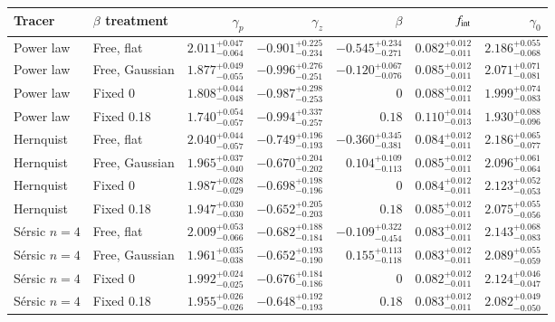 \begin{tabular}{llrrrrr}
\toprule
Tracer & $\beta$ treatment & $\gamma_p$ & $\gamma_z$ & $\beta$ & $f_{\rm int}$ & $\gamma_0$ \\
\midrule
Power law & Free, flat & $2.011_{-0.064}^{+0.047}$ & $-0.901_{-0.234}^{+0.225}$ & $-0.545_{-0.271}^{+0.234}$ & $0.082_{-0.011}^{+0.012}$ & $2.186_{-0.068}^{+0.055}$ \\
Power law & Free, Gaussian & $1.877_{-0.055}^{+0.049}$ & $-0.996_{-0.251}^{+0.276}$ & $-0.120_{-0.076}^{+0.067}$ & $0.085_{-0.011}^{+0.012}$ & $2.071_{-0.081}^{+0.071}$ \\
Power law & Fixed 0 & $1.808_{-0.048}^{+0.044}$ & $-0.987_{-0.253}^{+0.298}$ & $0$ & $0.088_{-0.011}^{+0.012}$ & $1.999_{-0.083}^{+0.074}$ \\
Power law & Fixed 0.18 & $1.740_{-0.057}^{+0.054}$ & $-0.994_{-0.257}^{+0.337}$ & $0.18$ & $0.110_{-0.013}^{+0.014}$ & $1.930_{-0.096}^{+0.088}$ \\
Hernquist & Free, flat & $2.040_{-0.057}^{+0.044}$ & $-0.749_{-0.193}^{+0.196}$ & $-0.360_{-0.381}^{+0.345}$ & $0.084_{-0.011}^{+0.012}$ & $2.186_{-0.077}^{+0.065}$ \\
Hernquist & Free, Gaussian & $1.965_{-0.040}^{+0.037}$ & $-0.670_{-0.202}^{+0.204}$ & $0.104_{-0.113}^{+0.109}$ & $0.085_{-0.011}^{+0.012}$ & $2.096_{-0.064}^{+0.061}$ \\
Hernquist & Fixed 0 & $1.987_{-0.029}^{+0.028}$ & $-0.698_{-0.196}^{+0.198}$ & $0$ & $0.084_{-0.011}^{+0.012}$ & $2.123_{-0.053}^{+0.052}$ \\
Hernquist & Fixed 0.18 & $1.947_{-0.030}^{+0.030}$ & $-0.652_{-0.203}^{+0.205}$ & $0.18$ & $0.085_{-0.011}^{+0.012}$ & $2.075_{-0.056}^{+0.055}$ \\
S\'ersic $n=4$ & Free, flat & $2.009_{-0.066}^{+0.053}$ & $-0.682_{-0.184}^{+0.188}$ & $-0.109_{-0.454}^{+0.322}$ & $0.083_{-0.011}^{+0.012}$ & $2.143_{-0.083}^{+0.068}$ \\
S\'ersic $n=4$ & Free, Gaussian & $1.961_{-0.038}^{+0.035}$ & $-0.652_{-0.190}^{+0.193}$ & $0.155_{-0.118}^{+0.113}$ & $0.083_{-0.011}^{+0.012}$ & $2.089_{-0.059}^{+0.055}$ \\
S\'ersic $n=4$ & Fixed 0 & $1.992_{-0.025}^{+0.024}$ & $-0.676_{-0.186}^{+0.184}$ & $0$ & $0.082_{-0.011}^{+0.012}$ & $2.124_{-0.047}^{+0.046}$ \\
S\'ersic $n=4$ & Fixed 0.18 & $1.955_{-0.026}^{+0.026}$ & $-0.648_{-0.193}^{+0.192}$ & $0.18$ & $0.083_{-0.011}^{+0.012}$ & $2.082_{-0.050}^{+0.049}$ \\
\bottomrule
\end{tabular}
